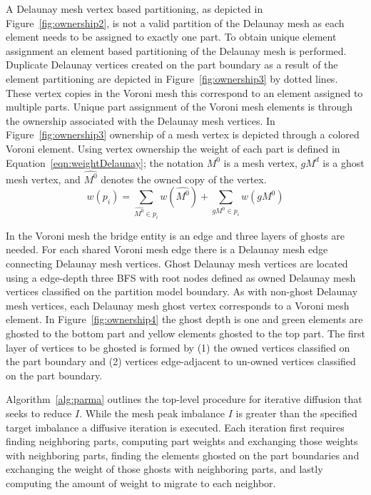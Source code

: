 \documentclass[a4paper]{article}
\begin{document}
A Delaunay mesh vertex based partitioning, as depicted in
Figure~\ref{fig:ownership2}, is not a valid partition of the Delaunay mesh as
each element needs to be assigned to exactly one part.
To obtain unique element assignment an element based partitioning of the
Delaunay mesh is performed.
Duplicate Delaunay vertices created on the part boundary as a result of the
element partitioning are depicted in Figure~\ref{fig:ownership3} by dotted
lines.
These vertex copies in the Voroni mesh this correspond to an element assigned to
multiple parts.
Unique part assignment of the Voroni mesh elements is through the ownership
associated with the Delaunay mesh vertices.
In Figure~\ref{fig:ownership3} ownership of a mesh vertex is depicted through a
colored Voroni element.
Using vertex ownership the weight of each part is defined in
Equation~\ref{eqn:weightDelaunay}; the notation $M^0$ is a mesh vertex, $gM^d$
is a ghost mesh vertex, and $\hat{M^0}$ denotes the owned copy of the vertex.
\begin{equation}
\label{eqn:weightDelaunay}
w(p_i) = \sum_{\hat{M^0} \in p_i}w(\hat{M^0}) + \sum_{gM^0 \in p_i}w(gM^0)
\end{equation}

In the Voroni mesh the bridge entity is an edge and three layers of ghosts are
needed.
For each shared Voroni mesh edge there is a Delaunay mesh edge connecting
Delaunay mesh vertices.
Ghost Delaunay mesh vertices are located using a edge-depth three BFS with root
nodes defined as owned Delaunay mesh vertices classified on the partition model
boundary.
As with non-ghost Delaunay mesh vertices, each Delaunay mesh ghost vertex
corresponds to a Voroni mesh element.
In Figure~\ref{fig:ownership4} the ghost depth is one and green elements are
ghosted to the bottom part and yellow elements ghosted to the top part.
The first layer of vertices to be ghosted is formed by (1) the owned vertices
classified on the part boundary and (2) vertices edge-adjacent to un-owned
vertices classified on the part boundary.

Algorithm~\ref{alg:parma} outlines the top-level procedure for iterative
diffusion that seeks to reduce $I$.
While the mesh peak imbalance $I$ is greater than the specified target imbalance
a diffusive iteration is executed.
Each iteration first requires finding neighboring parts, computing part weights
and exchanging those weights with neighboring parts, finding the elements
ghosted on the part boundaries and exchanging the weight of those ghosts with
neighboring parts, and lastly computing the amount of weight to migrate to each
neighbor.
\end{document}
